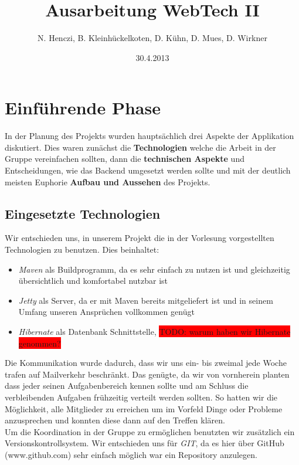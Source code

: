 \documentclass[12pt,a4paper]{article}
\title{Ausarbeitung WebTech II}
\author{N. Henczi, B. Kleinhückelkoten, D. Kühn, D. Mues, D. Wirkner}
\date{30.4.2013}
\begin{document}
	
\maketitle
\thispagestyle{empty}
\pagestyle{empty}

\newcommand{\TODO}[1]{\colorbox{red}{TODO: #1}}
	
\section{Einführende Phase}
In der Planung des Projekts wurden hauptsächlich drei Aspekte der Applikation diskutiert. Dies waren zunächst die \textbf{Technologien} welche die Arbeit in der Gruppe vereinfachen sollten, dann die \textbf{technischen Aspekte} und Entscheidungen, wie das Backend umgesetzt werden sollte und mit der deutlich meisten Euphorie \textbf{Aufbau und Aussehen} des Projekts.

\subsection{Eingesetzte Technologien}
Wir entschieden uns, in unserem Projekt die in der Vorlesung vorgestellten Technologien zu benutzen. Dies beinhaltet:

\begin{itemize}
\item \textit{Maven} als Buildprogramm, da es sehr einfach zu nutzen ist und gleichzeitig übersichtlich und komfortabel nutzbar ist
\item \textit{Jetty} als Server, da er mit Maven bereits mitgeliefert ist und in seinem Umfang unseren Ansprüchen vollkommen genügt
\item \textit{Hibernate} als Datenbank Schnittstelle, \TODO{warum haben wir Hibernate genommen?}
\end{itemize}

Die Kommunikation wurde dadurch, dass wir uns ein- bis zweimal jede Woche trafen auf Mailverkehr beschränkt. Das genügte, da wir von vornherein planten dass jeder seinen Aufgabenbereich kennen sollte und am Schluss die verbleibenden Aufgaben frühzeitig verteilt werden sollten. So hatten wir die Möglichkeit, alle Mitglieder zu erreichen um im Vorfeld Dinge oder Probleme anzusprechen und konnten diese dann auf den Treffen klären. \\

Um die Koordination in der Gruppe zu ermöglichen benutzten wir zusätzlich ein Versionskontrollsystem. Wir entschieden uns für \textit{GIT}, da es hier über GitHub (www.github.com) sehr einfach möglich war ein Repository anzulegen.
\end{document}
